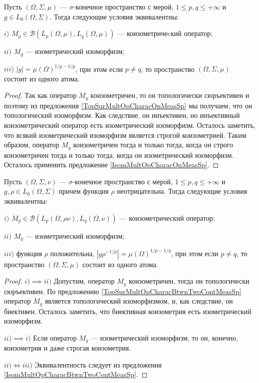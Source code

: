 \begin{proposition}\label{CoisomMultOpCharacOnMeasSp} Пусть $(\Omega,\Sigma,\mu)$ --- $\sigma$-конечное пространство с мерой, $1\leq p,q\leq +\infty$ и $g\in L_0(\Omega,\Sigma)$. Тогда следующие условия эквивалентны:

$i)$ $M_g\in\mathcal{B}(L_p(\Omega,\mu),L_q(\Omega,\mu))$ --- коизометричеcкий оператор;

$ii)$ $M_g$ --- изометрический изоморфизм;

$iii)$ $|g|=\mu(\Omega)^{1/q-1/p}$, при этом если $p\neq q$, то пространство $(\Omega,\Sigma,\mu)$ состоит из одного атома.
\end{proposition}
\begin{proof} Так как оператор $M_g$ коизометричен, то он топологически сюръективен и поэтому из предложения \ref{TopSurMultOpCharacOnMeasSp} мы получаем, что он топологический изоморфизм. Как следствие, он инъективен, но инъективный коизометрический оператор есть изометрический изоморфизм. Осталось заметить, что всякий изометрический изоморфизм является строгой коизометрией. Таким образом, оператор $M_g$ коизометричен тогда и только тогда, когда он строго коизометричен тогда и только тогда, когда он изометрический изоморфизм. Осталось применить предложение \ref{IsomMultOpCharacOnMeasSp}.
\end{proof}

\begin{proposition}\label{CoisomMultOpCharacBtwnTwoContMeasSp} Пусть $(\Omega,\Sigma,\nu)$ --- $\sigma$-конечное пространство с мерой, $1\leq p,q\leq +\infty$ и $g,\rho\in L_0(\Omega,\Sigma)$ причем функция $\rho$ неотрицательна. Тогда следующие условия эквивалентны:

$i)$ $M_g\in\mathcal{B}(L_p(\Omega,\rho \nu),L_q(\Omega,\nu))$ --- коизометрический оператор; 

$ii)$ $M_g$ --- изометрический изоморфизм;

$iii)$ функция $\rho$ положительна, $|g  \rho^{-1/p}|=\mu(\Omega)^{1/p-1/q}$, при этом если $p\neq q$, то пространство $(\Omega,\Sigma,\mu)$ состоит из одного атома.
\end{proposition}
\begin{proof} $i)$$\implies$$ ii)$ Допустим, оператор $M_g$ коизометричен, тогда он топологически сюръективен. По предложению \ref{TopSurMultOpCharacBtwnTwoContMeasSp} оператор $M_g$ является топологический изоморфизмом, и, как следствие, он биективен. Осталось заметить, что биективная коизометрия есть изометрический изоморфизм.

$ii)$$\implies$$ i)$ Если оператор $M_g$ --- изометрический изоморфизм, то он, конечно, коизометрия и даже строгая коизометрия.

$ii)\Longleftrightarrow iii)$ Эквивалентность следует из предложения \ref{IsomMultOpCharacBtwnTwoContMeasSp}.
\end{proof}

